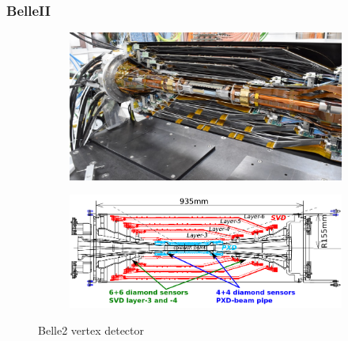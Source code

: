         \subsubsection{BelleII}
        \begin{figure}
            \centering
            \begin{subfigure}[b]{0.45\textwidth}
                \centering
                \includegraphics[width=\linewidth]{figures/pixel_detectors_usage/Belle2_vertex.png}
                \caption{}
                \label{fig:Belle2_photo}
            \end{subfigure}
            \hfill
            \begin{subfigure}[b]{0.53\textwidth}
                \centering
                \includegraphics[width=\linewidth]{figures/pixel_detectors_usage/SVD_Belle2.png}      
                \caption{}
                \label{fig:Belle2_scheme}
            \end{subfigure}
            \caption{Belle2 vertex detector}
            \label{fig:Belle2_Vertex}
       \end{figure}

